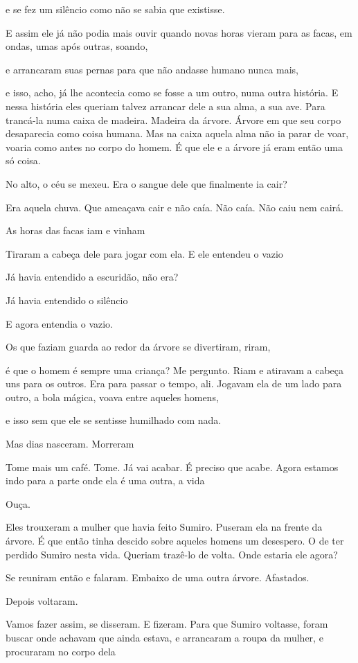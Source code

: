 e se fez um silêncio como não se sabia que existisse.

E assim ele já não podia mais ouvir quando novas horas vieram para as
facas, em ondas, umas após outras, soando,

e arrancaram suas pernas para que não andasse humano nunca mais,

e isso, acho, já lhe acontecia como se fosse a um outro, numa outra
história. E nessa história eles queriam talvez arrancar dele a sua alma,
a sua ave. Para trancá-la numa caixa de madeira. Madeira da árvore.
Árvore em que seu corpo desaparecia como coisa humana. Mas na caixa
aquela alma não ia parar de voar, voaria como antes no corpo do homem. É
que ele e a árvore já eram então uma só coisa.

No alto, o céu se mexeu. Era o sangue dele que finalmente ia cair?

Era aquela chuva. Que ameaçava cair e não caía. Não caía. Não caiu nem
cairá.

As horas das facas iam e vinham

Tiraram a cabeça dele para jogar com ela. E ele entendeu o vazio

Já havia entendido a escuridão, não era?

Já havia entendido o silêncio

E agora entendia o vazio.

Os que faziam guarda ao redor da árvore se divertiram, riram,

é que o homem é sempre uma criança? Me pergunto. Riam e atiravam a
cabeça uns para os outros. Era para passar o tempo, ali. Jogavam ela de
um lado para outro, a bola mágica, voava entre aqueles homens,

e isso sem que ele se sentisse humilhado com nada.

Mas dias nasceram. Morreram

Tome mais um café. Tome. Já vai acabar. É preciso que acabe. Agora
estamos indo para a parte onde ela é uma outra, a vida

Ouça.

Eles trouxeram a mulher que havia feito Sumiro. Puseram ela na frente da
árvore. É que então tinha descido sobre aqueles homens um desespero. O
de ter perdido Sumiro nesta vida. Queriam trazê-lo de volta. Onde
estaria ele agora?

Se reuniram então e falaram. Embaixo de uma outra árvore. Afastados.

Depois voltaram.

Vamos fazer assim, se disseram. E fizeram. Para que Sumiro voltasse,
foram buscar onde achavam que ainda estava, e arrancaram a roupa da
mulher, e procuraram no corpo dela

